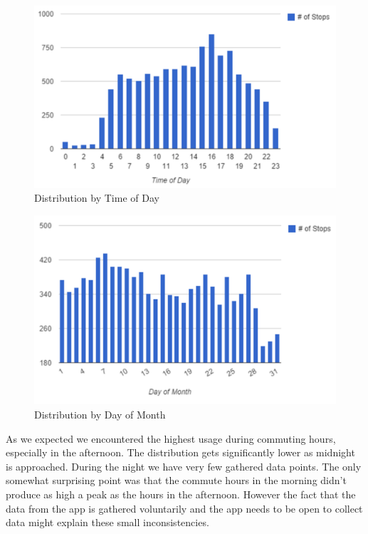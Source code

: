 \begin{figure}[!ht]
	\caption{Distribution by Time of Day}
	\centering
	\includegraphics[width=1.0\textwidth]{charts/distribution_time_of_day}
\end{figure}

\begin{figure}[!ht]
	\caption{Distribution by Day of Month}
	\centering
	\includegraphics[width=1.0\textwidth]{charts/day_of_month_distribution}
\end{figure}

As we expected we encountered the highest usage during commuting hours, especially in the afternoon. The distribution gets significantly lower as midnight is approached. During the night we have very few gathered data points. The only somewhat surprising point was that the commute hours in the morning didn't produce as high a peak as the hours in the afternoon. However the fact that the data from the app is gathered voluntarily and the app needs to be open to collect data might explain these small inconsistencies.

